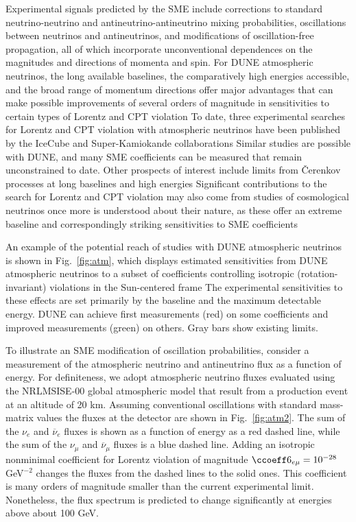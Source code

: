 Experimental signals predicted by the SME include
corrections to standard neutrino-neutrino 
and antineutrino-antineutrino mixing probabilities,
oscillations between neutrinos and antineutrinos,
and modifications of oscillation-free propagation,
all of which incorporate unconventional dependences
on the magnitudes and directions of momenta and spin.
For DUNE atmospheric neutrinos,
the long available baselines,
the comparatively high energies accessible,
and the broad range of momentum directions
offer major advantages that can make possible 
improvements of several orders of magnitude
in sensitivities to certain types of Lorentz and CPT violation
To date,
three experimental searches for Lorentz and CPT violation
with atmospheric neutrinos have been published 
by the IceCube and Super-Kamiokande collaborations
Similar studies are possible with DUNE,
and many SME coefficients can be measured that remain unconstrained to date.
Other prospects of interest include limits from \v Cerenkov processes
at long baselines and high energies
Significant contributions to the search 
for Lorentz and CPT violation may also 
come from studies of cosmological neutrinos
once more is understood about their nature,
as these offer an extreme baseline
and correspondingly striking sensitivities
to SME coefficients

An example of the potential reach of studies with DUNE atmospheric neutrinos
is shown in Fig.\ \ref{fig:atm},
which displays estimated sensitivities
from DUNE atmospheric neutrinos to a subset of coefficients 
controlling isotropic (rotation-invariant) violations 
in the Sun-centered frame
The experimental sensitivities to these effects
are set primarily by the baseline and the maximum detectable energy.
DUNE can achieve first measurements (red) on some coefficients
and improved measurements (green) on others.
Gray bars show existing limits.

To illustrate an SME modification of oscillation probabilities,
consider a measurement of the atmospheric neutrino and antineutrino flux
as a function of energy.
For definiteness,
we adopt atmospheric neutrino fluxes 
evaluated using the NRLMSISE-00 global atmospheric model
that result from a production event at an altitude of 20 km.
Assuming conventional oscillations with standard mass-matrix values 
the fluxes at the detector are shown in Fig.\ \ref{fig:atm2}.
The sum of the $\nu_e$ and $\overline\nu_e$ fluxes
is shown as a function of energy as a red dashed line, 
while the sum of the $\nu_\mu$ and $\overline\nu_\mu$ fluxes 
is a blue dashed line. 
Adding an isotropic nonminimal coefficient for Lorentz violation
of magnitude $\ccoeff 6_{e \mu} = 10^{-28}$ GeV$^{-2}$
changes the fluxes from the dashed lines to the solid ones.
This coefficient is many orders of magnitude smaller
than the current experimental limit.
Nonetheless,
the flux spectrum is predicted to change significantly 
at energies above about 100 GeV. 

